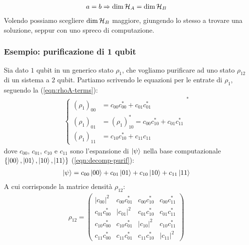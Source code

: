 \documentclass[../../InformazioneQuantistica.tex]{subfiles}
\begin{document}
\begin{align*}
a=b\Rightarrow \operatorname{dim}\mathcal{H}_A = \operatorname{dim}\mathcal{H}_B
\end{align*}
Volendo possiamo scegliere $\operatorname{dim}\mathcal{H}_B$ maggiore, giungendo lo stesso a trovare una soluzione, seppur con uno spreco di computazione.


\subsubsection{Esempio: purificazione di 1 qubit}
Sia dato $1$ qubit in un generico stato $\rho_1$, che vogliamo purificare ad uno stato $\rho_{12}$ di un sistema a $2$ qubit. Partiamo scrivendo le equazioni per le entrate di $\rho_1$, seguendo la (\ref{eqn:rhoA-terms}):
\begin{align}\label{eqn:sist-purificazione}
\begin{cases}
(\rho_1)_{00} &= c_{00} c_{00}^* + c_{01} c^*_{01}\\
(\rho_1)_{01} &= (\rho_1)^*_{10} = c_{00}c_{10}^* + c_{01}c_{11}^*\\
(\rho_1)_{11} &= c_{10}c_{10}^* + c_{11}c_{11}
\end{cases}^*
\end{align}
dove $c_{00}$, $c_{01}$, $c_{10}$ e $c_{11}$ sono l'espansione di $\Ket{\psi}$ nella base computazionale $\{\Ket{00}, \Ket{01}, \Ket{10}, \Ket{11}\}$ (\ref{eqn:decomp-purif}):
\begin{align*}
\Ket{\psi}=c_{00}\Ket{00}+c_{01}\Ket{01}+c_{10}\Ket{10}+c_{11}\Ket{11}
\end{align*}
A cui corrisponde la matrice densità $\rho_{12}$:
\begin{align*}
\rho_{12} = \left(
\begin{array}{cc|cc}
|c_{00}|^2 & c_{00}c_{01}^* & c_{00}c_{10}^* & c_{00}c_{11}^*\\
c_{01}c_{00}^* & |c_{01}|^2 & c_{01}c_{10}^* & c_{01}c_{11}^*\\ \hline
c_{10}c_{00}^* & c_{10}c_{01}^* & |c_{10}|^2 & c_{10}c_{11}^*\\
c_{11}c_{00}^* & c_{11}c_{01}^* & c_{11}c_{10}^* & |c_{11}|^2
\end{array}
\right)
\end{align*}
\end{document}
